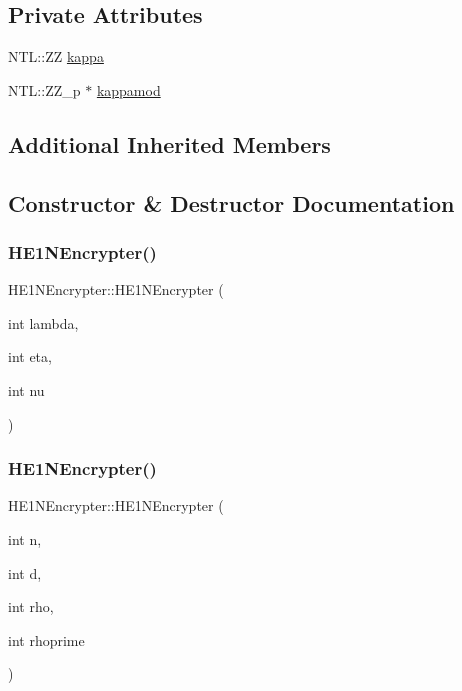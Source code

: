 \subsection*{Private Attributes}
\begin{DoxyCompactItemize}
\item 
N\+T\+L\+::\+ZZ \hyperlink{classHE1NEncrypter_a6ae3f5e69318587ba70afc87d21e6e11}{kappa}
\item 
N\+T\+L\+::\+Z\+Z\+\_\+p $\ast$ \hyperlink{classHE1NEncrypter_ae878596c30bc5825c3366366bf2b07fc}{kappamod}
\end{DoxyCompactItemize}
\subsection*{Additional Inherited Members}


\subsection{Constructor \& Destructor Documentation}
\mbox{\label{classHE1NEncrypter_ac8b2f33fc7d1cba481944b16072efab0}} 
\subsubsection{\texorpdfstring{H\+E1\+N\+Encrypter()}{HE1NEncrypter()}\hspace{0.1cm}{\footnotesize\ttfamily [1/3]}}
{\footnotesize\ttfamily H\+E1\+N\+Encrypter\+::\+H\+E1\+N\+Encrypter (\begin{DoxyParamCaption}\item[{int}]{lambda,  }\item[{int}]{eta,  }\item[{int}]{nu }\end{DoxyParamCaption})}

\mbox{\label{classHE1NEncrypter_a744ec5a8d26d1877114d6bd679a9e9ed}} 
\subsubsection{\texorpdfstring{H\+E1\+N\+Encrypter()}{HE1NEncrypter()}\hspace{0.1cm}{\footnotesize\ttfamily [2/3]}}
{\footnotesize\ttfamily H\+E1\+N\+Encrypter\+::\+H\+E1\+N\+Encrypter (\begin{DoxyParamCaption}\item[{int}]{n,  }\item[{int}]{d,  }\item[{int}]{rho,  }\item[{int}]{rhoprime }\end{DoxyParamCaption})}

